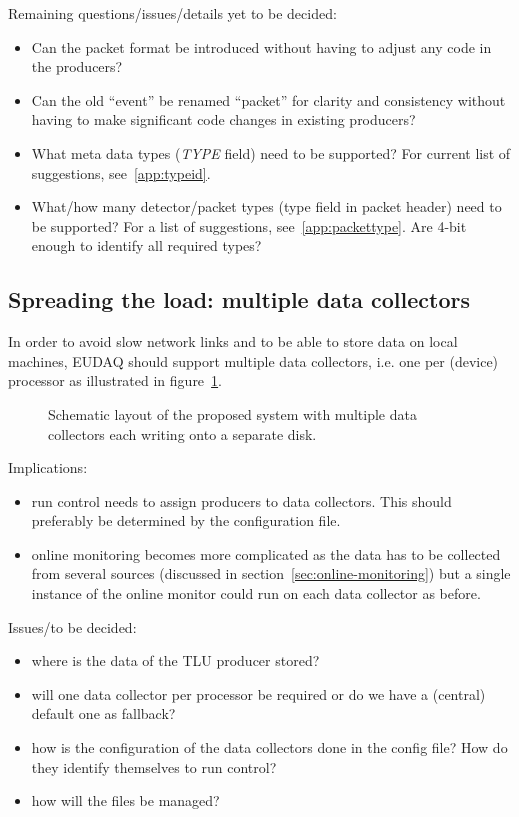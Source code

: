 \documentclass[paper=a4, fontsize=11pt]{scrartcl}	%
\numberwithin{equation}{section}		%
\numberwithin{figure}{section}			%
\numberwithin{table}{section}				%
\begin{document}
Remaining questions/issues/details yet to be decided:
\begin{itemize}
\item Can the packet format be introduced without having to adjust any
  code in the producers?
\item Can the old ``event'' be renamed ``packet'' for clarity and
  consistency without having to make significant code changes in
  existing producers?
\item What meta data types (\emph{TYPE} field) need to be supported?
  For current list of suggestions, see~\ref{app:typeid}.
\item What/how many detector/packet types (type field in packet
  header) need to be supported? For a list of suggestions,
  see~\ref{app:packettype}. Are 4-bit enough to identify all required types?
\end{itemize}


\subsection{Spreading the load: multiple data collectors}
\label{sec:datacollectors}
In order to avoid slow network links and to be able to store data on
local machines, EUDAQ should support multiple data collectors,
i.e. one per (device) processor as illustrated in figure~\ref{fig:schematiclayout}.

\begin{figure}[htbp]
  \centering
  
  \caption{Schematic layout of the proposed system with multiple data
    collectors each writing onto a separate disk.}
\label{fig:schematiclayout}
\end{figure}

Implications:
\begin{itemize}
\item run control needs to assign producers to data collectors. This
  should preferably be determined by the configuration file.
\item online monitoring becomes more complicated as the data has to be
  collected from several sources (discussed in
  section~\ref{sec:online-monitoring}) but a single instance of the online monitor
  could run on each data collector as before.
\end{itemize}

Issues/to be decided:
\begin{itemize}
\item where is the data of the TLU producer stored?
\item will one data collector per processor be required or do we have
  a (central) default one as fallback?
\item how is the configuration of the data collectors done in the
  config file? How do they identify themselves to run control?
\item how will the files be managed?
\end{itemize}
\end{document}
